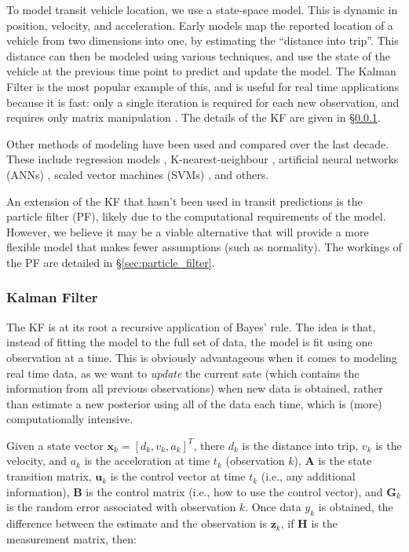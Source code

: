 \documentclass[12pt,a4paper]{article}
\newcommand{\bu}{\boldsymbol{u}}
\newcommand{\bx}{\boldsymbol{x}}
\newcommand{\bz}{\boldsymbol{z}}
\begin{document}
To model transit vehicle location, we use a state-space model.
This is dynamic in position, velocity, and acceleration.
Early models map the reported location of a vehicle from two dimensions into one,
by estimating the ``distance into trip''.
This distance can then be modeled using various techniques, 
and use the state of the vehicle at the previous time point to predict and update the model.
The Kalman Filter is the most popular example of this, and is useful for real time applications
because it is fast: only a single iteration is required for each new observation, and requires only matrix manipulation
\citep{cathey-dailey:2003,cn}.
The details of the KF are given in \S\ref{sec:kalman_filter}.


Other methods of modeling have been used and compared over the last decade.
These include regression models \citep{cn}, 
K-nearest-neighbour \citep{cn}, 
artificial neural networks (ANNs) \citep{cn},
scaled vector machines (SVMs) \citep{cn}, 
and others.


An extension of the KF that hasn't been used in transit predictions is the particle filter (PF),
likely due to the computational requirements of the model.
However, we believe it may be a viable alternative that will provide a more flexible model that
makes fewer assumptions (such as normality).
The workings of the PF are detailed in \S\ref{sec:particle_filter}.


\subsubsection{Kalman Filter}
\label{sec:kalman_filter}

The KF is at its root a recursive application of Bayes' rule.
The idea is that, instead of fitting the model to the full set of data,
the model is fit using one observation at a time.
This is obviously advantageous when it comes to modeling real time data,
as we want to \emph{update} the current sate (which contains the information from all previous observations)
when new data is obtained,
rather than estimate a new posterior using all of the data each time, which is (more) computationally intensive.

Given a state vector $\bx_k = \left[d_k, v_k, a_k\right]^T$, there $d_k$ is the distance into trip,
$v_k$ is the velocity, and $a_k$ is the acceleration at time $t_k$ (observation $k$),
$\mathbf{A}$ is the state transition matrix,
$\bu_k$ is the control vector at time $t_k$ (i.e., any additional information),
$\mathbf{B}$ is the control matrix (i.e., how to use the control vector), 
and $\mathbf{G}_k$ is the random error associated with observation $k$.
Once data $y_k$ is obtained, the difference between the estimate and the observation is $\bz_k$,
if $\mathbf{H}$ is the measurement matrix, then:
\end{document}
